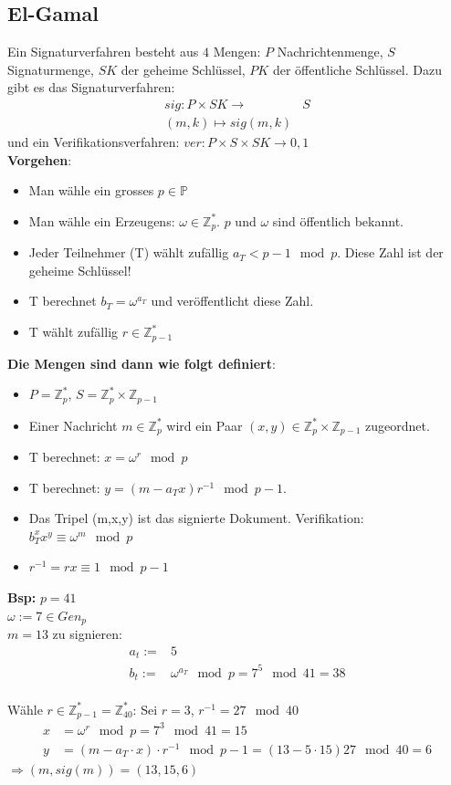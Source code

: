 \documentclass[10pt]{article}
\newcommand{\ZN}{\mathbb{Z}} %
\newcommand{\Bold}[1]{\textbf{#1}} %
\newcommand{\Ra}{\Rightarrow}
\begin{document}
\subsection{El-Gamal}
Ein Signaturverfahren besteht aus $4$ Mengen: $P$ Nachrichtenmenge, $S$ Signaturmenge, $SK$ der geheime Schlüssel, $PK$ der öffentliche Schlüssel. Dazu gibt es das Signaturverfahren:
\begin{align}
sig: P \times SK \rightarrow& S \\
(m,k) \mapsto sig(m, k)
\end{align}
und ein Verifikationsverfahren: $ver: P \times S \times SK \rightarrow {0,1}$\\
\textbf{Vorgehen}:
\begin{itemize}
	\item Man wähle ein grosses $p \in \mathbb{P}$
	\item Man wähle ein Erzeugens: $\omega \in \mathbb{Z}_p^*$. $p$ und $\omega$ sind öffentlich bekannt.
	\item Jeder Teilnehmer (T) wählt zufällig $a_T < p-1 \mod p$. Diese Zahl ist der geheime Schlüssel!
	\item T berechnet $b_T = \omega^{a_T}$ und veröffentlicht diese Zahl.
	\item T wählt zufällig $r \in \mathbb{Z}_{p-1}^*$
\end{itemize}
\textbf{Die Mengen sind dann wie folgt definiert}:
\begin{itemize}
	\item $P = \mathbb{Z}_p^*$, $S = \mathbb{Z}_p^* \times \mathbb{Z}_{p-1}$ 
	\item Einer Nachricht $m \in \mathbb{Z}_p^*$ wird ein Paar $(x, y) \in \mathbb{Z}_p^* \times \mathbb{Z}_{p-1}$ zugeordnet. 
	\item T berechnet: $x = \omega ^r \mod p$ 
	\item T berechnet: $y = (m-a_T x)r^{-1} \mod p-1$. 
	\item Das Tripel (m,x,y) ist das signierte Dokument. Verifikation: $b_T^x x^y \equiv \omega ^m \mod p$
	\item $r^{-1} = rx \equiv 1 \mod p-1$
\end{itemize}
  \Bold{Bsp:} $p=41$\\
  $\omega:=7\in Gen_p$\\
  $m=13$ zu signieren:
  \begin{align*}
   a_t:=&5\\
   b_t:=&\omega^{a_T}\mod p=7^5\mod 41=38
  \end{align*}\\
  Wähle $r\in\ZN_{p-1}^*=\ZN_{40}^*$: Sei $r=3$, $r^{-1}=27\mod40$\\
  \begin{align*}
   x&=\omega^r\mod p=7^3\mod41=15\\
   y&=(m-a_T\cdot x)\cdot r^{-1}\mod p-1=(13-5\cdot 15)27\mod40=6
  \end{align*}
  $\Ra(m,sig(m))=(13,15,6)$
\end{document}
